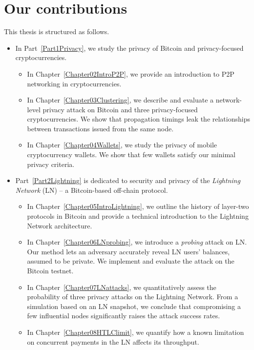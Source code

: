 \section{Our contributions}

This thesis is structured as follows.

\begin{itemize}
	\item 
	In Part~\ref{Part1Privacy}, we study the privacy of Bitcoin and privacy-focused cryptocurrencies.
	\begin{itemize}
		\item
	In Chapter~\ref{Chapter02IntroP2P}, we provide an introduction to P2P networking in cryptocurrencies.
		\item
	In Chapter~\ref{Chapter03Clustering}, we describe and evaluate a network-level privacy attack on Bitcoin and three privacy-focused cryptocurrencies.
	We show that propagation timings leak the relationships between transactions issued from the same node.
		\item
	In Chapter~\ref{Chapter04Wallets}, we study the privacy of mobile cryptocurrency wallets.
	We show that few wallets satisfy our minimal privacy criteria.
	\end{itemize}

	\item
	Part~\ref{Part2Lightning} is dedicated to security and privacy of the \textit{Lightning Network} (LN) -- a Bitcoin-based off-chain protocol.
	\begin{itemize}
		\item 
	In Chapter~\ref{Chapter05IntroLightning}, we outline the history of layer-two protocols in Bitcoin and provide a technical introduction to the Lightning Network architecture.
		\item
	In Chapter~\ref{Chapter06LNprobing}, we introduce a \textit{probing} attack on LN\@.
	Our method lets an adversary accurately reveal LN users' balances, assumed to be private.
	We implement and evaluate the attack on the Bitcoin testnet.
		\item
	In Chapter~\ref{Chapter07LNattacks}, we quantitatively assess the probability of three privacy attacks on the Lightning Network.
	From a simulation based on an LN snapshot, we conclude that compromising a few influential nodes significantly raises the attack success rates.
		\item
	In Chapter~\ref{Chapter08HTLClimit}, we quantify how a known limitation on concurrent payments in the LN affects its throughput.
	\end{itemize}


\end{itemize}
